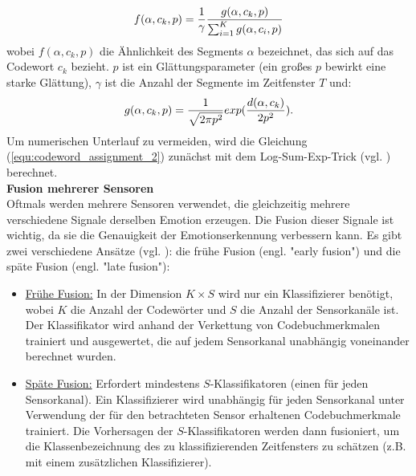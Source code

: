 \begin{equation} 
\Large{ {f(\alpha,c_k,p) = \frac{1}{\gamma}} \frac{g(\alpha,c_k,p)}{\sum_{i=1}^{K} g(\alpha,c_i,p)}}
\end{equation}
\newline
wobei $f(\alpha,c_k,p)$ die Ähnlichkeit des Segments $\alpha$ bezeichnet, das sich auf das Codewort $c_k$ bezieht. $p$ ist ein Glättungsparameter (ein großes $p$ bewirkt eine starke Glättung), $\gamma$ ist die Anzahl der Segmente im Zeitfenster $T$ und: \\
\begin{equation} 
\Large{ { g(\alpha,c_k,p) = \frac{1}{\sqrt{2 \pi p^{ 2 }}}} exp(\frac{d(\alpha,c_k)}{2p^{2}}). }
\label{equ:codeword_assignment_2} \end{equation}
\newline
Um numerischen Unterlauf zu vermeiden, wird die Gleichung (\ref{equ:codeword_assignment_2}) zunächst mit dem Log-Sum-Exp-Trick (vgl. \cite{murphy_2012}) berechnet. \\


\textbf{Fusion mehrerer Sensoren \\}
Oftmals werden mehrere Sensoren verwendet, die gleichzeitig mehrere verschiedene Signale derselben Emotion erzeugen.
Die Fusion dieser Signale ist wichtig, da sie die Genauigkeit der Emotionserkennung verbessern kann.
Es gibt zwei verschiedene Ansätze (vgl. \cite{snoek_2005}): die frühe Fusion (engl. "early fusion") und die späte Fusion (engl. "late fusion"): 

\begin{itemize}
  \item \underline{Frühe Fusion:} In der Dimension $K \times S$ wird nur ein Klassifizierer benötigt, wobei $K$ die Anzahl der Codewörter und $S$ die Anzahl der Sensorkanäle ist. Der Klassifikator wird anhand der Verkettung von Codebuchmerkmalen trainiert und ausgewertet, die auf jedem Sensorkanal unabhängig voneinander berechnet wurden.

  \item \underline{Späte Fusion:} Erfordert mindestens $S$-Klassifikatoren (einen für jeden Sensorkanal). Ein Klassifizierer wird unabhängig für jeden Sensorkanal unter Verwendung der für den betrachteten Sensor erhaltenen Codebuchmerkmale trainiert. Die Vorhersagen der $S$-Klassifikatoren werden dann fusioniert, um die Klassenbezeichnung des zu klassifizierenden Zeitfensters zu schätzen (z.B. mit einem zusätzlichen Klassifizierer).
\end{itemize} \vspace{0.5cm}


